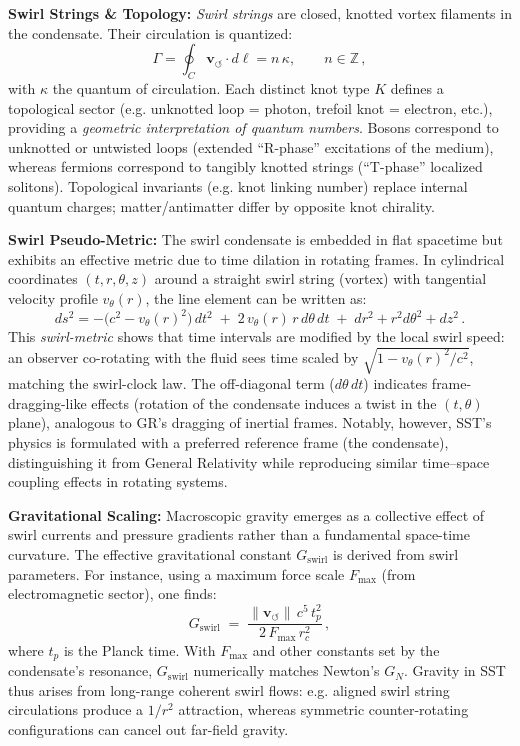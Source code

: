 \documentclass[10pt,a4paper]{article}
\begin{document}
\noindent \textbf{Swirl Strings \& Topology:} \emph{Swirl strings} are closed, knotted vortex filaments in the condensate. Their circulation is quantized:
\[
    \Gamma = \oint_C \mathbf{v}_{\!\boldsymbol{\circlearrowleft}}\cdot d\ell = n\,\kappa, \qquad n\in\mathbb{Z}\,,
\]
with $\kappa$ the quantum of circulation. Each distinct knot type $K$ defines a topological sector (e.g. unknotted loop = photon, trefoil knot = electron, etc.), providing a \emph{geometric interpretation of quantum numbers}. Bosons correspond to unknotted or untwisted loops (extended “R-phase” excitations of the medium), whereas fermions correspond to tangibly knotted strings (“T-phase” localized solitons). Topological invariants (e.g. knot linking number) replace internal quantum charges; matter/antimatter differ by opposite knot chirality.

\noindent \textbf{Swirl Pseudo-Metric:} The swirl condensate is embedded in flat spacetime but exhibits an effective metric due to time dilation in rotating frames. In cylindrical coordinates $(t,r,\theta,z)$ around a straight swirl string (vortex) with tangential velocity profile $v_\theta(r)$, the line element can be written as:
\[
    ds^2 = -\big(c^2 - v_\theta(r)^2\big)\,dt^2 \;+\;2\,v_\theta(r)\,r\,d\theta\,dt\;+\;dr^2 + r^2 d\theta^2 + dz^2\,.
\]
This \emph{swirl-metric} shows that time intervals are modified by the local swirl speed: an observer co-rotating with the fluid sees time scaled by $\sqrt{1 - v_\theta(r)^2/c^2}$, matching the swirl-clock law. The off-diagonal term ($d\theta\,dt$) indicates frame-dragging-like effects (rotation of the condensate induces a twist in the $(t,\theta)$ plane), analogous to GR’s dragging of inertial frames. Notably, however, SST’s physics is formulated with a preferred reference frame (the condensate), distinguishing it from General Relativity while reproducing similar time–space coupling effects in rotating systems.

\noindent \textbf{Gravitational Scaling:} Macroscopic gravity emerges as a collective effect of swirl currents and pressure gradients rather than a fundamental space-time curvature. The effective gravitational constant $G_{\text{swirl}}$ is derived from swirl parameters. For instance, using a maximum force scale $F_{\max}$ (from electromagnetic sector), one finds:
\[
    G_{\text{swirl}} \;=\; \frac{\|\mathbf{v}_{\!\boldsymbol{\circlearrowleft}}\|\,c^5\,t_p^2}{2\,F_{\max}\,r_c^2}\,,
\]
where $t_p$ is the Planck time. With $F_{\max}$ and other constants set by the condensate’s resonance, $G_{\text{swirl}}$ numerically matches Newton’s $G_N$. Gravity in SST thus arises from long-range coherent swirl flows: e.g. aligned swirl string circulations produce a $1/r^2$ attraction, whereas symmetric counter-rotating configurations can cancel out far-field gravity.
\end{document}
